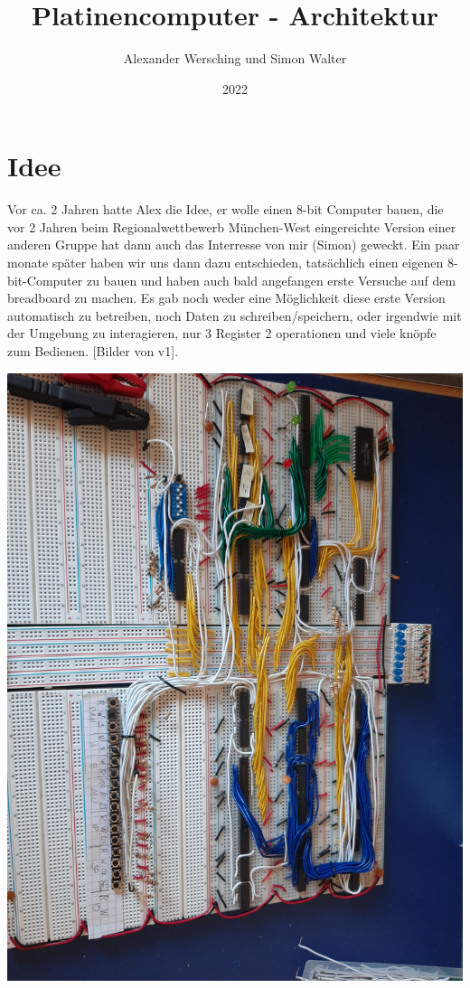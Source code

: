 \documentclass{scrartcl}
\begin{document}
    \title{Platinencomputer - Architektur}
    \author{Alexander Wersching und Simon Walter}
    \date{2022}
    \maketitle

    \newpage
    \tableofcontents
    \newpage

    \section{Idee}


    Vor ca. 2 Jahren hatte Alex die Idee, er wolle einen 8-bit Computer bauen, die vor 2 Jahren beim Regionalwettbewerb München-West eingereichte Version einer anderen Gruppe hat dann auch das Interresse von mir (Simon) geweckt.
    Ein paar monate später haben wir uns dann dazu entschieden, tatsächlich einen eigenen 8-bit-Computer zu bauen und haben auch bald angefangen erste Versuche auf dem breadboard zu machen.
    Es gab noch weder eine Möglichkeit diese erste Version automatisch zu betreiben, noch Daten zu schreiben/speichern, oder irgendwie mit der Umgebung zu interagieren, nur 3 Register 2 operationen und viele knöpfe zum Bedienen. [Bilder von v1].

    \includegraphics[width=\linewidth/2,angle=0]{Computer_V01_Overview_01}
\end{document}
